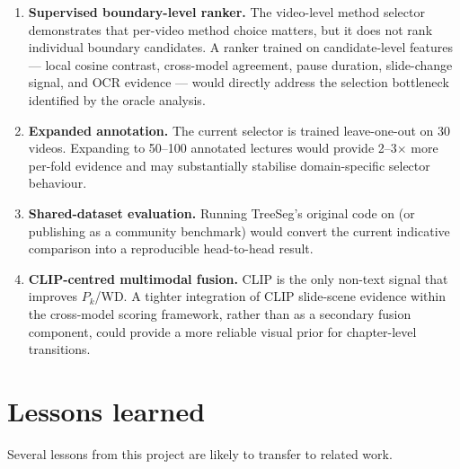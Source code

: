 \begin{enumerate}
  \item \textbf{Supervised boundary-level ranker.}
    The video-level method selector demonstrates that per-video method choice
    matters, but it does not rank individual boundary candidates.
    A ranker trained on candidate-level features --- local cosine contrast,
    cross-model agreement, pause duration, slide-change signal, and OCR
    evidence --- would directly address the selection bottleneck identified
    by the oracle analysis.

  \item \textbf{Expanded annotation.}
    The current selector is trained leave-one-out on 30 videos.
    Expanding to 50--100 annotated lectures would provide 2--3$\times$ more
    per-fold evidence and may substantially stabilise domain-specific selector
    behaviour.

  \item \textbf{Shared-dataset evaluation.}
    Running TreeSeg's original code on \dataset{} (or publishing \dataset{} as
    a community benchmark) would convert the current indicative comparison
    into a reproducible head-to-head result.

  \item \textbf{CLIP-centred multimodal fusion.}
    CLIP is the only non-text signal that improves $P_k$/WD.
    A tighter integration of CLIP slide-scene evidence within the cross-model
    scoring framework, rather than as a secondary fusion component, could
    provide a more reliable visual prior for chapter-level transitions.
\end{enumerate}

\section{Lessons learned}
\label{sec:lessons}

Several lessons from this project are likely to transfer to related work.

